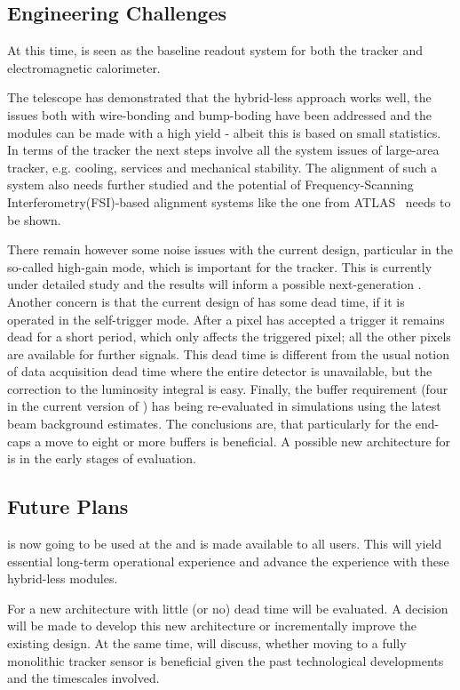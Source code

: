 \subsection{Engineering Challenges}
At this time, \KPIX is seen as the baseline readout system for both the \SID tracker and electromagnetic calorimeter. 

The \LYCORIS telescope has demonstrated that the hybrid-less approach works well, the issues both with wire-bonding and 
bump-boding have been addressed and the modules can be made with a high yield - albeit this is based on small statistics.
In terms of the \SID tracker the next steps involve all the system issues of large-area tracker, e.g. cooling, services and mechanical stability. 
The alignment of such a system also needs further studied and the potential of Frequency-Scanning Interferometry(FSI)-based alignment systems like the one from ATLAS~\cite{ Coe:2004vq}
needs to be shown. 

There remain however some noise issues with the current \KPIX design, particular in the so-called high-gain mode, 
which is important for the tracker. This is currently under detailed study and the results will inform a possible 
next-generation \KPIX. Another concern is that the current design of \KPIX has some dead time, if it is operated in the self-trigger mode. 
After a pixel has accepted a trigger it remains dead for a short period, which only affects the triggered pixel; all the other 
pixels are available for further signals. This dead time is different from the usual 
notion of data acquisition dead time where the entire detector is unavailable, 
but the correction to the luminosity integral is easy. Finally, the buffer 
requirement (four in the current version of \KPIX) has being re-evaluated in \SID  
simulations using the latest beam background estimates. The conclusions are, that particularly for 
the end-caps a move to eight or more buffers is beneficial. A possible new architecture for \KPIX is in 
the early stages of evaluation.

\subsection{Future Plans}
\LYCORIS is now going to be used at the \DIITBF and is made available to all users. This will yield essential long-term operational experience and 
advance the experience with these hybrid-less modules.  

For \KPIX a new architecture with little (or no) dead time will be evaluated. A decision will be made to develop this new architecture or incrementally 
improve the existing design. At the same time, \SID will discuss, whether moving to a fully monolithic tracker sensor is beneficial given the past technological 
developments and the timescales involved.
	
